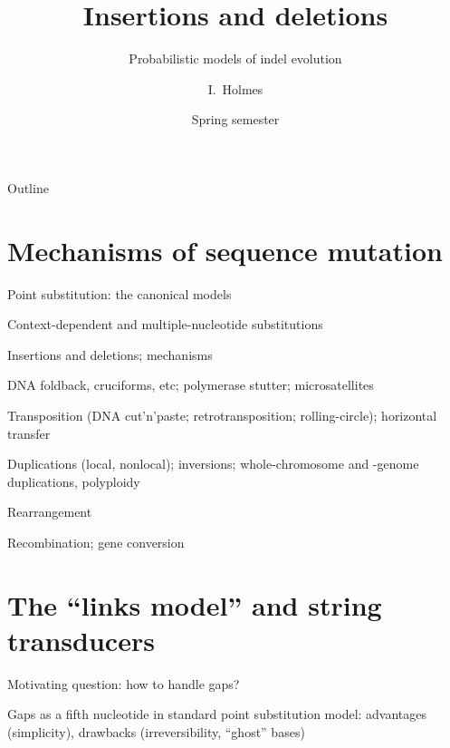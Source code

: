 \documentclass{beamer}
\title[Indels] %
{Insertions and deletions}
\subtitle
{Probabilistic models of indel evolution} %
\author%
{I.~Holmes} %
\institute[University of California, Berkeley] %
{
  Department of Bioengineering\\
  University of California, Berkeley}
\date%
{Spring semester}
\begin{document}
\begin{frame}
  \titlepage
\end{frame}

\begin{frame}{Outline}
  \tableofcontents
\end{frame}


\section{Mechanisms of sequence mutation}

\begin{frame}{}

\itemb
\item Point substitution: the canonical models
\item Context-dependent and multiple-nucleotide substitutions
\item Insertions and deletions; mechanisms
 \itemb
 \item DNA foldback, cruciforms, etc; polymerase stutter; microsatellites
 \item Transposition (DNA cut'n'paste; retrotransposition; rolling-circle); horizontal transfer
 \iteme
\item Duplications (local, nonlocal); inversions; whole-chromosome and -genome duplications, polyploidy
\item Rearrangement
\item Recombination; gene conversion
\iteme

\end{frame}

\section{The ``links model'' and string transducers}

\begin{frame}{}

\itemb
\item Motivating question: how to handle gaps?
\item Gaps as a fifth nucleotide in standard point substitution model: advantages (simplicity), drawbacks (irreversibility, ``ghost'' bases)
\iteme

\end{frame}
\end{document}
